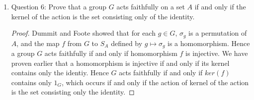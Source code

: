 \documentclass{article}
\begin{document}
\begin{enumerate}
\begin{enumerate}
\begin{proof}
          Now we show that the stabilizer of $a$ in $G$ is a subgroup of
          $G$. The stabilizer is not empty because it contains $1_G$. Let
          $g_1,g_2\in G$ be in the stabilizer. It remains to show that
          $g_1g_2^{-1}$ is also in the stabilizer. Now
          \begin{align*}
            g_2^{-1}\cdot a & = \sigma_{g_2^{-1}}(a) & \\
                            & = \sigma_{g_2}^{-1}(a) & (\because\,\text{the
            map from $G$ to $S_ A$ is a homomorphism}) \\
                            & = a, & (\because\,\sigma_{g_2}(a)=a)
          \end{align*}
          implying that $g_2^{-1}$ is also in the stabilizer. Then
          \begin{align*}
            (g_1g_2^{-1})\cdot a  & = g_1\cdot(g_2^{-1}\cdot a)  &
              (\text{by group action rules}) \\
                                  & = g_1\cdot(a) & (\because
                                  g_2^{-1}\,\text{is in the stabilizer}) \\
                                  & = a           & (\because a\,\text{is
                                  in the stabilizer}) \\
          \end{align*}
          Hence $g_1g_2^{-1}$ is also in the stabilizer, as we are required
          to show. \\
        \end{proof}

      \item Question 6: Prove that a group $G$ acts faithfully on a set $A$
        if and only if the kernel of the action is the set consisting only
        of the identity.

        \begin{proof}
          Dummit and Foote showed that for each $g\in G$, $\sigma_g$ is a
          permutation of $A$, and the map $f$ from $G$ to $S_A$ defined by
          $g\mapsto\sigma_g$ is a homomorphism. Hence a group $G$ acts
          faithfully if and only if homomorphism $f$ is injective. We have
          proven earlier that a homomorphism is injective if and only
          if its kernel contains only the identiy. Hence $G$ acts
          faithfully if and only if $ker(f)$ contains only $1_G$, which
          occurs if and only if the action of kernel of the action is the
          set consisting only the identity.
        \end{proof}


\end{enumerate}
\end{enumerate}
\end{document}
